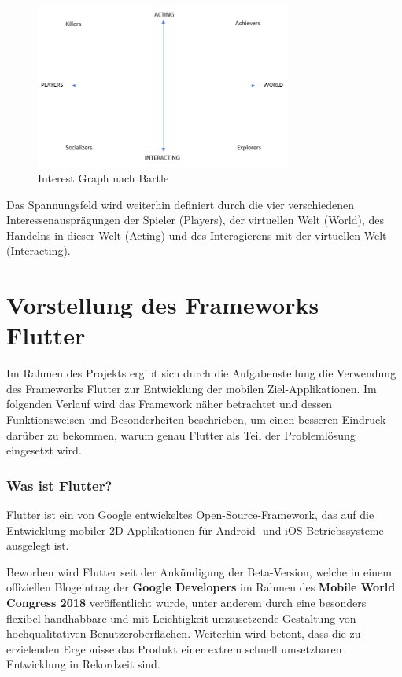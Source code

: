 \documentclass[bibliography=totoc,listof=totoc,BCOR=5mm,DIV=12,oneside]{scrbook}
\begin{document}
\bigskip
\begin{figure}[H]
	\centering
	\includegraphics[width=0.75\textwidth, keepaspectratio]{Bilder/Diagramme/InterestGraphBartle.png}
	\caption{Interest Graph nach Bartle \cite{bartle1996hearts}}
	\label{img:interetGraphBartle}
\end{figure}

\par \bigskip Das Spannungsfeld wird weiterhin definiert durch die vier verschiedenen Interessenausprägungen der Spieler (Players), der virtuellen Welt (World), des Handelns in dieser Welt (Acting) und des Interagierens mit der virtuellen Welt (Interacting).

\newpage
\chapter{Vorstellung des Frameworks Flutter}
\par Im Rahmen des Projekts ergibt sich durch die Aufgabenstellung die Verwendung des Frameworks Flutter zur Entwicklung der mobilen Ziel-Applikationen. Im folgenden Verlauf wird das Framework näher betrachtet und dessen Funktionsweisen und Besonderheiten beschrieben, um einen besseren Eindruck darüber zu bekommen, warum genau Flutter als Teil der Problemlösung eingesetzt wird.

\subsection{Was ist Flutter?} 
\par Flutter ist ein von Google entwickeltes Open-Source-Framework, das auf die Entwicklung mobiler 2D-Applikationen für Android- und iOS-Betriebssysteme ausgelegt ist. 
\par \bigskip Beworben wird Flutter seit der Ankündigung der Beta-Version, welche in einem offiziellen Blogeintrag der \textbf{Google Developers}\citep{AnouncingFlutterBeta} im Rahmen des \textbf{Mobile World Congress 2018}\citep{MobileWordCongress} veröffentlicht wurde, unter anderem durch eine besonders flexibel handhabbare und mit Leichtigkeit umzusetzende Gestaltung von hochqualitativen Benutzeroberflächen. Weiterhin wird betont, dass die zu erzielenden Ergebnisse das Produkt einer extrem schnell umsetzbaren Entwicklung \grqq in Rekordzeit\grqq{} sind.
\end{document}
